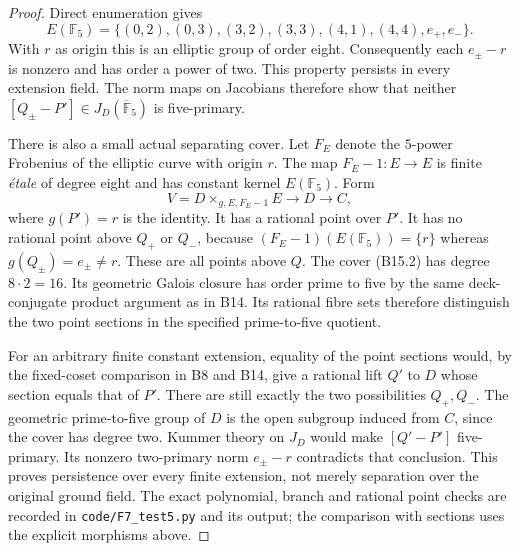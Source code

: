 \begin{proof}
Direct enumeration gives
\[
 E(\mathbb F_5)=
 \{(0,2),(0,3),(3,2),(3,3),(4,1),(4,4),e_+,e_-\}.
\]
With $r$ as origin this is an elliptic group of order eight.
Consequently each $e_\pm-r$ is nonzero and has order a power of
two. This property persists in every extension field. The norm
maps on Jacobians therefore show that neither
$[Q_\pm-P']\in J_D(\overline{\mathbb F}_5)$ is five-primary.

There is also a small actual separating cover. Let $F_E$ denote
the $5$-power Frobenius of the elliptic curve with origin $r$.
The map $F_E-1:E\to E$ is finite \emph{\'etale} of degree eight
and has constant kernel $E(\mathbb F_5)$. Form
\[
       V=D\times_{g,E,F_E-1}E\longrightarrow D\longrightarrow C,
 \tag{B15.2}
\]
where $g(P')=r$ is the identity. It has a rational point over $P'$.
It has no rational point above $Q_+$ or $Q_-$, because
$(F_E-1)(E(\mathbb F_5))=\{r\}$ whereas $g(Q_\pm)=e_\pm\ne r$.
These are all points above $Q$. The cover (B15.2) has degree
$8\cdot2=16$. Its geometric Galois closure has order prime to
five by the same deck-conjugate product argument as in B14.
Its rational fibre sets therefore distinguish the two point
sections in the specified prime-to-five quotient.

For an arbitrary finite constant extension, equality of the point
sections would, by the fixed-coset comparison in B8 and B14,
give a rational lift $Q'$ to $D$ whose section equals that of $P'$.
There are still exactly the two possibilities $Q_+,Q_-$. The
geometric prime-to-five group of $D$ is the open subgroup induced
from $C$, since the cover has degree two. Kummer theory on $J_D$
would make $[Q'-P']$ five-primary. Its nonzero two-primary norm
$e_\pm-r$ contradicts that conclusion. This proves persistence
over every finite extension, not merely separation over the
original ground field. The exact polynomial, branch and rational
point checks are recorded in \texttt{code/F7\_test5.py} and its
output; the comparison with sections uses the explicit morphisms
above.
\end{proof}
